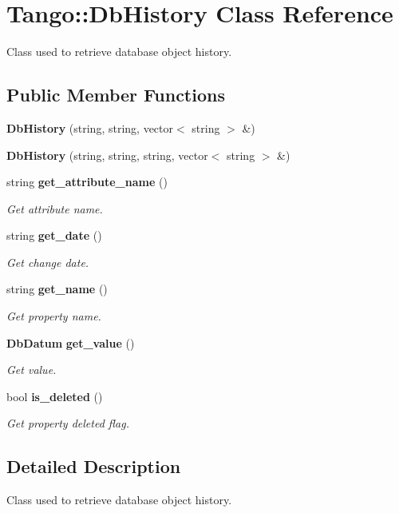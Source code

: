 \section{Tango\-:\-:Db\-History Class Reference}
\label{classTango_1_1DbHistory}


Class used to retrieve database object history.  


\subsection*{Public Member Functions}
\begin{DoxyCompactItemize}
\item 
{\bf Db\-History} (string, string, vector$<$ string $>$ \&)
\item 
{\bf Db\-History} (string, string, string, vector$<$ string $>$ \&)
\item 
string {\bf get\-\_\-attribute\-\_\-name} ()
\begin{DoxyCompactList}\small\item\em Get attribute name. \end{DoxyCompactList}\item 
string {\bf get\-\_\-date} ()
\begin{DoxyCompactList}\small\item\em Get change date. \end{DoxyCompactList}\item 
string {\bf get\-\_\-name} ()
\begin{DoxyCompactList}\small\item\em Get property name. \end{DoxyCompactList}\item 
{\bf Db\-Datum} {\bf get\-\_\-value} ()
\begin{DoxyCompactList}\small\item\em Get value. \end{DoxyCompactList}\item 
bool {\bf is\-\_\-deleted} ()
\begin{DoxyCompactList}\small\item\em Get property deleted flag. \end{DoxyCompactList}\end{DoxyCompactItemize}


\subsection{Detailed Description}
Class used to retrieve database object history. 

